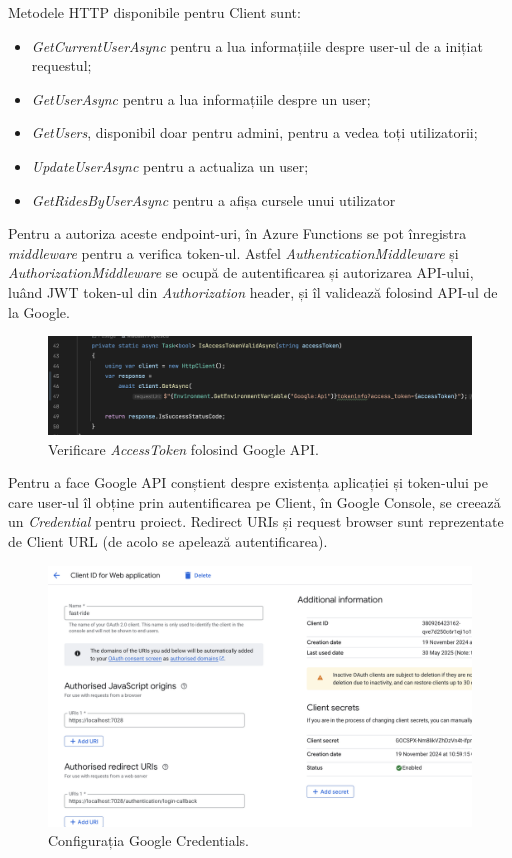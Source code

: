 Metodele HTTP disponibile pentru Client sunt:
\begin{itemize}
    \item \textit{GetCurrentUserAsync} pentru a lua informațiile despre user-ul de a inițiat requestul;
    \item \textit{GetUserAsync} pentru a lua informațiile despre un user;
    \item \textit{GetUsers}, disponibil doar pentru admini, pentru a vedea toți utilizatorii;
    \item \textit{UpdateUserAsync} pentru a actualiza un user;
    \item \textit{GetRidesByUserAsync} pentru a afișa cursele unui utilizator
\end{itemize}

Pentru a autoriza aceste endpoint-uri, în Azure Functions se pot înregistra \textit{middleware} pentru 
a verifica token-ul. Astfel \textit{AuthenticationMiddleware} și \textit{AuthorizationMiddleware} se ocupă de autentificarea 
și autorizarea API-ului, luând JWT token-ul din \textit{Authorization} header, și îl validează
folosind API-ul de la Google.

\begin{figure}[H]
    \centering
    \includegraphics[width=16cm]{Assets/GoogleAuthorization.png}
    \caption{Verificare \textit{AccessToken} folosind Google API.}
    \label{fig:GoogleAuthorization}
\end{figure}

Pentru a face Google API conștient despre existența aplicației și token-ului pe care user-ul îl obține
prin autentificarea pe Client, în Google Console, se creează un \textit{Credential} pentru proiect.
Redirect URIs și request browser sunt reprezentate de Client URL (de acolo se apelează autentificarea).

\begin{figure}[H]
    \centering
    \includegraphics[width=14cm]{Assets/GoogleConfig.png}
    \caption{Configurația Google Credentials.}
    \label{fig:GoogleConfig}
\end{figure}

